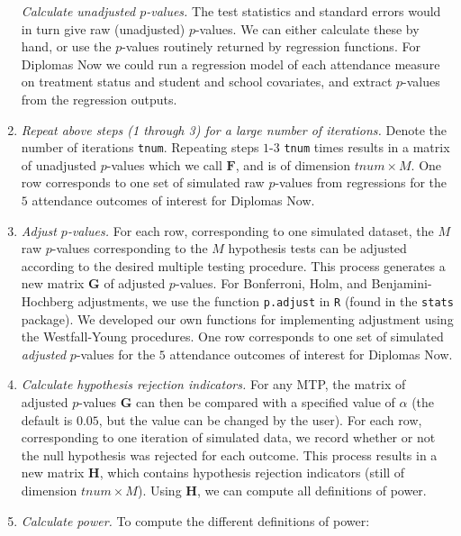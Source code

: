 \documentclass{article}
\begin{document}
\begin{enumerate}
  \emph{Calculate unadjusted \(p\)-values.} The test statistics and
  standard errors would in turn give raw (unadjusted) \(p\)-values. We
  can either calculate these by hand, or use the \(p\)-values routinely
  returned by regression functions. For Diplomas Now we could run a
  regression model of each attendance measure on treatment status and
  student and school covariates, and extract \(p\)-values from the
  regression outputs.
\item
  \emph{Repeat above steps (1 through 3) for a large number of
  iterations.} Denote the number of iterations \texttt{tnum}. Repeating
  steps \(1\)-\(3\) \texttt{tnum} times results in a matrix of
  unadjusted \(p\)-values which we call \(\mathbf{F}\), and is of
  dimension \(tnum \times M\). One row corresponds to one set of
  simulated raw \(p\)-values from regressions for the \(5\) attendance
  outcomes of interest for Diplomas Now.
\item
  \emph{Adjust \(p\)-values.} For each row, corresponding to one
  simulated dataset, the \(M\) raw \(p\)-values corresponding to the
  \(M\) hypothesis tests can be adjusted according to the desired
  multiple testing procedure. This process generates a new matrix
  \(\mathbf{G}\) of adjusted \(p\)-values. For Bonferroni, Holm, and
  Benjamini-Hochberg adjustments, we use the function \texttt{p.adjust}
  in \texttt{R} (found in the \texttt{stats} package). We developed our
  own functions for implementing adjustment using the Westfall-Young
  procedures. One row corresponds to one set of simulated
  \emph{adjusted} \(p\)-values for the \(5\) attendance outcomes of
  interest for Diplomas Now.
\item
  \emph{Calculate hypothesis rejection indicators.} For any MTP, the
  matrix of adjusted \(p\)-values \(\mathbf{G}\) can then be compared
  with a specified value of \(\alpha\) (the default is \(0.05\), but the
  value can be changed by the user). For each row, corresponding to one
  iteration of simulated data, we record whether or not the null
  hypothesis was rejected for each outcome. This process results in a
  new matrix \(\mathbf{H}\), which contains hypothesis rejection
  indicators (still of dimension \(tnum \times M\)). Using
  \(\mathbf{H}\), we can compute all definitions of power.
\item
  \emph{Calculate power.} To compute the different definitions of power:
\end{enumerate}
\end{document}
